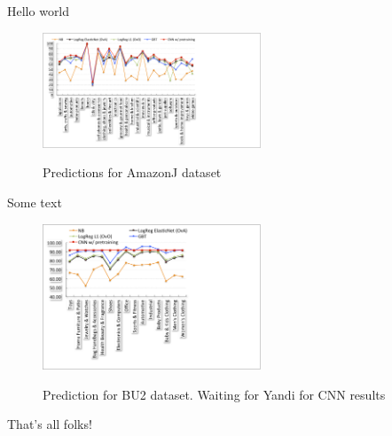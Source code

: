 Hello world



\begin{figure}
\centering
\includegraphics[width=0.58\textwidth]{images/amazonj-WUC-predictions}
\label{Figure_amazonj-WUC-predictions}
\caption{Predictions for AmazonJ dataset}
\end{figure}

Some text
\vspace{7cm}

\begin{figure}
\centering
\includegraphics[width=0.58\textwidth]{images/BU2-WUC-predictions}
\label{Figure_BU2-WUC-predictions}
\caption{Prediction for BU2 dataset. Waiting for Yandi for CNN results}
\end{figure}

That's all folks!